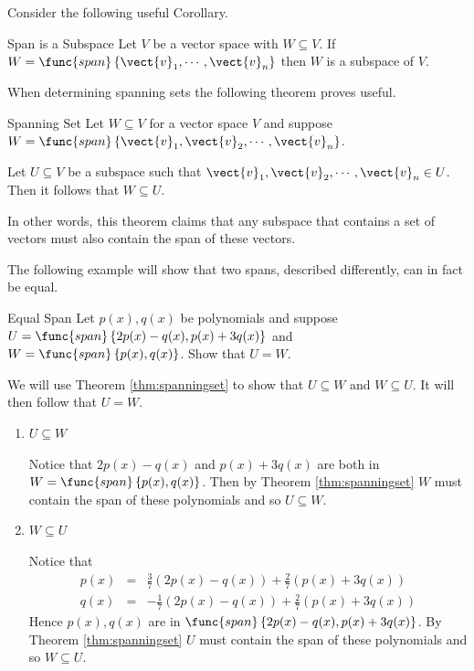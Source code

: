Consider the following useful Corollary.

\begin{corollary}{Span is a Subspace}\label{cor:spansubspace}
Let $V$ be a vector space with $W \subseteq V$. If $W = \func{span} \left\{ \vect{v}_1, \cdots,  \vect{v}_n \right\}$ then $W$ is a subspace of $V$.
\end{corollary}

When determining spanning sets the following theorem proves useful.

\begin{theorem}{Spanning Set}\label{thm:spanningset}
Let $W \subseteq V$ for a vector space $V$ and suppose $W = \func{span} \left\{ \vect{v}_1, \vect{v}_2, \cdots, \vect{v}_n \right\}$. 

Let $U \subseteq V$ be a subspace such that $\vect{v}_1, \vect{v}_2, \cdots, \vect{v}_n \in U$. Then it follows that $W \subseteq U$. 
\end{theorem}

In other words, this theorem claims that any subspace that contains a set of vectors must also contain the span of these vectors. 

The following example will show that two spans, described differently, can in fact be equal. 

\begin{example}{Equal Span}\label{exa:equalspan}
Let $p(x), q(x)$ be polynomials and suppose $U = \func{span}\left\{ 2p(x) - q(x), p(x) + 3q(x)\right\} $ and $W =  \func{span}\left\{ p(x), q(x) \right\}$. Show that $U = W$. 
\end{example}

\begin{solution}
We will use Theorem \ref{thm:spanningset} to show that $U \subseteq W$ and $W \subseteq U$. It will then follow that $U=W$. 
\begin{enumerate}
\item $U \subseteq W$

Notice that $2p(x) - q(x)$ and $p(x) + 3q(x)$  are both in $W = \func{span} \left\{ p(x), q(x) \right\}$. Then by Theorem \ref{thm:spanningset} $W$ must contain the span of these polynomials and so $U \subseteq W$. 

\item $W \subseteq U$

Notice that 
\begin{eqnarray*}
p(x) &=& \frac{3}{7} \left( 2p(x) - q(x) \right)  + \frac{2}{7} \left( p(x) + 3q(x)\right) \\
q(x) &=& -\frac{1}{7} \left( 2p(x) - q(x) \right)  + \frac{2}{7} \left( p(x) + 3q(x)\right)
\end{eqnarray*}
Hence $p(x), q(x)$ are in $\func{span} \left\{ 2p(x) - q(x), p(x) + 3q(x) \right\}$. By Theorem \ref{thm:spanningset} $U$ must contain the span of these polynomials and so $W \subseteq U$. 
\end{enumerate}
\end{solution}

